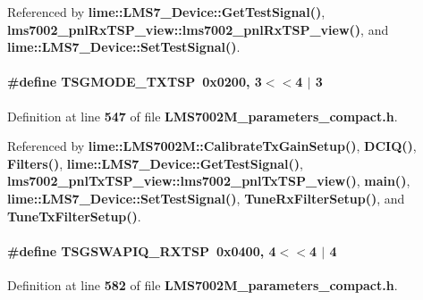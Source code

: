 Referenced by {\bf lime\+::\+L\+M\+S7\+\_\+\+Device\+::\+Get\+Test\+Signal()}, {\bf lms7002\+\_\+pnl\+Rx\+T\+S\+P\+\_\+view\+::lms7002\+\_\+pnl\+Rx\+T\+S\+P\+\_\+view()}, and {\bf lime\+::\+L\+M\+S7\+\_\+\+Device\+::\+Set\+Test\+Signal()}.

\paragraph[{T\+S\+G\+M\+O\+D\+E\+\_\+\+T\+X\+T\+SP}]{\setlength{\rightskip}{0pt plus 5cm}\#define T\+S\+G\+M\+O\+D\+E\+\_\+\+T\+X\+T\+SP~0x0200, 3$<$$<$4 $\vert$  3}\label{LMS7002M__parameters__compact_8h_ae2ce479402faeb80bac39494142bb6d5}


Definition at line {\bf 547} of file {\bf L\+M\+S7002\+M\+\_\+parameters\+\_\+compact.\+h}.



Referenced by {\bf lime\+::\+L\+M\+S7002\+M\+::\+Calibrate\+Tx\+Gain\+Setup()}, {\bf D\+C\+I\+Q()}, {\bf Filters()}, {\bf lime\+::\+L\+M\+S7\+\_\+\+Device\+::\+Get\+Test\+Signal()}, {\bf lms7002\+\_\+pnl\+Tx\+T\+S\+P\+\_\+view\+::lms7002\+\_\+pnl\+Tx\+T\+S\+P\+\_\+view()}, {\bf main()}, {\bf lime\+::\+L\+M\+S7\+\_\+\+Device\+::\+Set\+Test\+Signal()}, {\bf Tune\+Rx\+Filter\+Setup()}, and {\bf Tune\+Tx\+Filter\+Setup()}.

\paragraph[{T\+S\+G\+S\+W\+A\+P\+I\+Q\+\_\+\+R\+X\+T\+SP}]{\setlength{\rightskip}{0pt plus 5cm}\#define T\+S\+G\+S\+W\+A\+P\+I\+Q\+\_\+\+R\+X\+T\+SP~0x0400, 4$<$$<$4 $\vert$  4}\label{LMS7002M__parameters__compact_8h_abbf45a9bb2e0b793a68e2fbe58a331d9}


Definition at line {\bf 582} of file {\bf L\+M\+S7002\+M\+\_\+parameters\+\_\+compact.\+h}.



